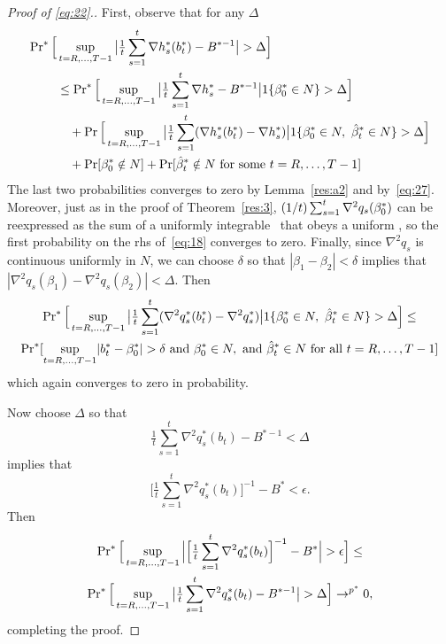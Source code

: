 \documentclass[12pt,fleqn]{article}
\begin{document}
\begin{proof}[Proof of \eqref{eq:22}.]
First, observe that for any $\Delta$
\begin{align}\label{eq:18}
  \operatorname{Pr}^*\Big[&\sup_{t = R,\dots,T-1} \big\lvert \tfrac{1}{t} \sum_{s=1}^t \nabla h_s^*(b_t^*) - B^{*-1} \big\rvert > \Delta \Big] \\
  &\leq \operatorname{Pr}^*\Big[\sup_{t=R,\dots,T-1} \big\lvert \tfrac{1}{t} \sum_{s=1}^t \nabla h_s^* - B^{*-1} \big\rvert 1\{\beta_0^* \in N\}> \Delta \Big]\\
  &\quad + \operatorname{Pr}\Big[\sup_{t=R,\dots,T-1} \big\lvert \tfrac{1}{t} \sum_{s=1}^t (\nabla h_s^*(b_t^*) - \nabla h_s^*) \big\rvert 1\{\beta_0^* \in N,\ \hat \beta_t^* \in N\} > \Delta \Big] \\
  &\quad + \operatorname{Pr}[\beta_0^* \notin N] + \operatorname{Pr}[\hat \beta_t^* \notin N \text{ for some } t = R,\dots,T-1]
\end{align}
The last two probabilities converges to zero by
Lemma~\ref{res:a2} and by~\eqref{eq:27}.  Moreover, just as in the proof of
Theorem~\ref{res:3}, $(1/t) \sum_{s=1}^t \nabla^2 q_s(\beta_0^*)$ can
be reexpressed as the sum of a uniformly integrable \mds\ that obeys
a uniform \lln, so the first probability on the rhs of~\eqref{eq:18}
converges to zero. Finally, since $\nabla^2 q_s$ is continuous
uniformly in $N$, we can choose $\delta$ so that $|\beta_1 - \beta_2|
< \delta$ implies that $|\nabla^2 q_s(\beta_1) - \nabla^2
q_s(\beta_2)| < \Delta$. Then
\begin{multline*}
  \pr^*\Big[\sup_{t=R,\dots,T-1} \big\lvert \tfrac{1}{t} \sum_{s=1}^t (\nabla^2 q_s^*(b_t^*) - \nabla^2 q_s^*) \big\rvert 1\{\beta_0^* \in N,\ \bh_t^* \in N\} > \Delta \Big]
  \leq \\
\pr^*[\sup_{t=R,\dots,T-1}  \lvert b_t^* - \btrue^* \rvert > \delta\text{ and } \btrue^* \in N,\text{ and } \bh_t^* \in N \text{ for all } t = R,\dots,T-1]
\end{multline*}
which again converges to zero in probability.

Now choose $\Delta$ so that
\begin{equation*}
  \tfrac{1}{t} \sum_{s=1}^t \nabla^2 q_s^*(b_t) - B^{*-1} < \Delta
\end{equation*}
implies that
\begin{equation*}
\Big[\tfrac{1}{t} \sum_{s=1}^t \nabla^2 q_s^*(b_t)\Big]^{-1} - B^* < \epsilon.
\end{equation*}
Then
\begin{multline*}
  \operatorname{Pr}^*\Big[\sup_{t=R,\dots,T-1} \Big\lvert\Big[\tfrac{1}{t} \sum_{s=1}^t \nabla^2 q_s^*(b_t)\Big]^{-1} - B^*\Big\rvert
  > \epsilon\Big] \leq \\
  \operatorname{Pr}^*\Big[\sup_{t=R,\dots,T-1}\big\lvert\tfrac{1}{t} \sum_{s=1}^t \nabla^2 q_s^*(b_t) - B^{*-1}\big\rvert > \Delta\Big]
  \to^{p^*} 0,
\end{multline*}
completing the proof.
\end{proof}
\end{document}
